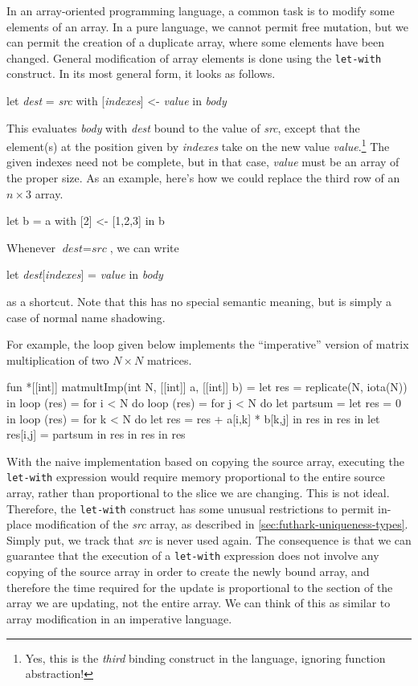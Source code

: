 \documentclass[oneside]{memoir}
\begin{document}
In an array-oriented programming language, a common task is to modify
some elements of an array.  In a pure language, we cannot permit free
mutation, but we can permit the creation of a duplicate array, where
some elements have been changed.  General modification of array
elements is done using the \texttt{let-with} construct.  In its most
general form, it looks as follows.
\begin{colorcode}
  let \textit{dest} = \textit{src} with [\textit{indexes}] <- \textit{value}
  in \textit{body}
\end{colorcode}
This evaluates \textit{body} with \textit{dest} bound to the value of
\textit{src}, except that the element(s) at the position given by
\textit{indexes} take on the new value \textit{value}.\footnote{Yes,
  this is the \emph{third} binding construct in the language, ignoring
  function abstraction!}  The given indexes need not be complete, but
in that case, \textit{value} must be an array of the proper size.  As
an example, here's how we could replace the third row of an $n\times3$
array.
\begin{colorcode}
  let b = a with [2] <- [1,2,3] in b
\end{colorcode}
Whenever $\textit{dest} = \textit{src}$, we can write
\begin{colorcode}
  let \textit{dest}[\textit{indexes}] = \textit{value} in \textit{body}
\end{colorcode}
as a shortcut.  Note that this has no special semantic meaning, but is
simply a case of normal name shadowing.

For example, the loop given below implements the ``imperative''
version of matrix multiplication of two $N\times N$ matrices.

\begin{colorcode}
fun *[[int]] matmultImp(int N, [[int]] a, [[int]] b) =
    let res = replicate(N, iota(N)) in
    loop (res) = for i < N do
        loop (res) = for j < N do
            let partsum =
                let res = 0 in
                loop (res) = for k < N do
                    let res = res + a[i,k] * b[k,j]
                    in  res
                in res
            in let res[i,j] = partsum in res
        in res
    in res
\end{colorcode}

With the naive implementation based on copying the source array,
executing the \texttt{let-with} expression would require memory
proportional to the entire source array, rather than proportional to
the slice we are changing.  This is not ideal.  Therefore, the
\texttt{let-with} construct has some unusual restrictions to permit
in-place modification of the \textit{src} array, as described in
\cref{sec:futhark-uniqueness-types}.  Simply put, we track that
\textit{src} is never used again.  The consequence is that we can
guarantee that the execution of a \texttt{let-with} expression does
not involve any copying of the source array in order to create the
newly bound array, and therefore the time required for the update is
proportional to the section of the array we are updating, not the
entire array.  We can think of this as similar to array modification
in an imperative language.
\end{document}
